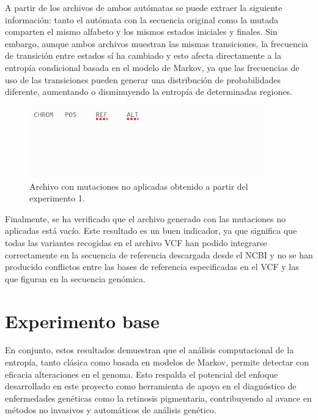 \documentclass[11pt,spanish,listoffigures,listoftables]{tfgetsinf}
\begin{document}
A partir de los archivos de ambos autómatas se puede extraer la siguiente información: tanto el autómata con la secuencia original como la mutada comparten el mismo alfabeto y los mismos estados iniciales y finales. Sin embargo, aunque ambos archivos muestran las mismas transiciones, la frecuencia de transición entre estados sí ha cambiado y esto afecta directamente a la entropía condicional basada en el modelo de Markov, ya que las frecuencias de uso de las transiciones pueden generar una distribución de probabilidades diferente, aumentando o disminuyendo la entropía de determinadas regiones. 

\begin{figure}[H]
      \centering
      \includegraphics[width=0.9\textwidth]{mut_exp1.png}
      \caption{Archivo con mutaciones no aplicadas obtenido a partir del experimento 1.}
      \label{fig:etiqueta_opcional15}
\end{figure}

Finalmente, se ha verificado que el archivo generado con las mutaciones no aplicadas está vacío. Este resultado es un buen indicador, ya que significa que todas las variantes recogidas en el archivo VCF han podido integrarse correctamente en la secuencia de referencia descargada desde el NCBI y no se han producido conflictos entre las bases de referencia especificadas en el VCF y las que figuran en la secuencia genómica. 


\section{Experimento base}


En conjunto, estos resultados demuestran que el análisis computacional de la entropía, tanto clásica como basada en modelos de Markov, permite detectar con eficacia alteraciones en el genoma. Esto respalda el potencial del enfoque desarrollado en este proyecto como herramienta de apoyo en el diagnóstico de enfermedades genéticas como la retinosis pigmentaria, contribuyendo al avance en métodos no invasivos y automáticos de análisis genético. 
\end{document}
